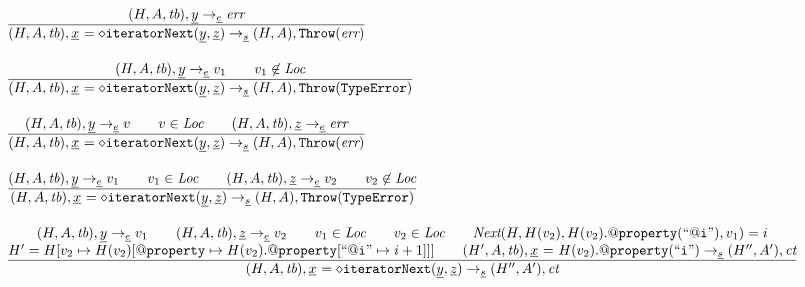 \documentclass[a4paper, leqno]{amsart}
\newcommand{\rulesep}{\quad\quad}
\newcommand{\stmt}{s}
\newcommand{\expr}{e}
\newcommand{\ir}[1]{\ensuremath{\underline{#1}}}
\newcommand{\irid}{\ir{x}}
\newcommand{\tb}{\emph{tb}}
\newcommand{\err}{\emph{err}}
\newcommand{\te}{{\tt TypeError}}
\newcommand{\Loc}{\emph{Loc}}
\newcommand{\ct}{\emph{ct}}
\newcommand{\hf}[1]{\emph{#1}}
\newcommand{\error}{\ensuremath{{\tt Throw}(\err)}}
\newcommand{\thte}{\ensuremath{{\tt Throw}(\te)}}
\newcommand{\state}{\ensuremath{(H,A,\tb)}}
\newcommand{\res}{\ensuremath{(H,A)}}
\newcommand{\evale}{\ensuremath{(H,A,\tb)}}
\begin{document}
\[\begin{array}{l@{~~}l@{~~}ll}
\frac{\begin{matrix}
\evale, \ir{y} \rightarrow_{\ir\expr} \err
\end{matrix}}{\begin{matrix}
\state, \irid \ {\tt = {\diamond}iteratorNext}(\ir{y}, \ir{z})  \rightarrow_{\ir\stmt} \res, \error
\end{matrix}}
\\[2em]

\frac{\begin{matrix}
\evale, \ir{y} \rightarrow_{\ir\expr} v_1
\rulesep
v_1\not\in\Loc
\end{matrix}}{\begin{matrix}
\state, \irid \ {\tt = {\diamond}iteratorNext}(\ir{y}, \ir{z})  \rightarrow_{\ir\stmt} \res, \thte
\end{matrix}}
\\[2em]

\frac{\begin{matrix}
\evale, \ir{y} \rightarrow_{\ir\expr} v
\rulesep
v\in\Loc
\rulesep
\evale, \ir{z} \rightarrow_{\ir\expr} \err
\end{matrix}}{\begin{matrix}
\state, \irid \ {\tt = {\diamond}iteratorNext}(\ir{y}, \ir{z})  \rightarrow_{\ir\stmt} \res, \error
\end{matrix}}
\\[2em]

\frac{\begin{matrix}
\evale, \ir{y} \rightarrow_{\ir\expr} v_1
\rulesep
v_1\in\Loc
\rulesep
\evale, \ir{z} \rightarrow_{\ir\expr} v_2
\rulesep
v_2\not\in\Loc
\end{matrix}}{\begin{matrix}
\state, \irid \ {\tt = {\diamond}iteratorNext}(\ir{y}, \ir{z})  \rightarrow_{\ir\stmt} \res, \thte
\end{matrix}}
\\[2em]

\frac{\begin{matrix}
\evale, \ir{y} \rightarrow_{\ir\expr} v_1
\rulesep
\evale, \ir{z} \rightarrow_{\ir\expr} v_2
\rulesep
v_1\in\Loc
\rulesep
v_2\in\Loc
\rulesep
\hf{Next}(H, H(v_2), H(v_2).{\tt@property}({\tt``@i"}),v_1) = i%
\\
H' = H[v_2 \mapsto H(v_2)[{\tt@property}\mapsto H(v_2).{\tt@property}[{\tt``@i"}\mapsto i+1]]]%
\rulesep
(H',A,\tb), \irid \ {\tt =} \ H(v_2).{\tt@property}({\tt``i"}) \rightarrow_{\ir\stmt} (H'',A'), \ct
\end{matrix}}{\begin{matrix}
\state, \irid \ {\tt = {\diamond}iteratorNext}(\ir{y}, \ir{z})  \rightarrow_{\ir\stmt} (H'',A'), \ct
\end{matrix}}
\\[2em]

\end{array}
\]
\end{document}
